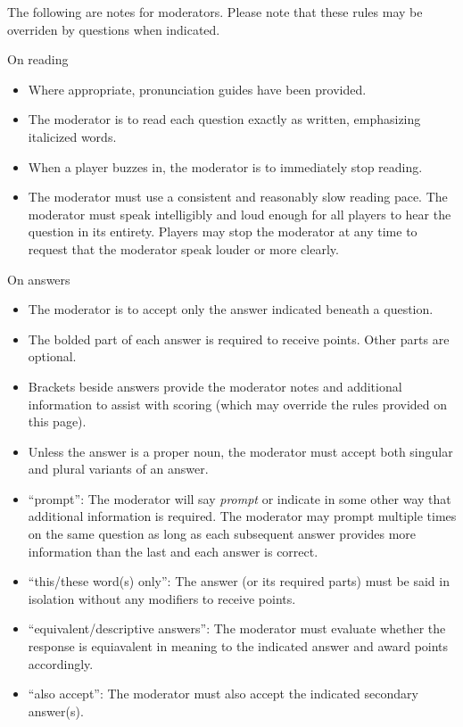 \thispagestyle{empty}
The following are notes for moderators. Please note that these rules may be overriden by questions when indicated.

\vspace*{0.3 cm}
On reading
\begin{itemize}
    \item Where appropriate, pronunciation guides have been provided.
    \item The moderator is to read each question exactly as written, emphasizing italicized words.
    \item When a player buzzes in, the moderator is to immediately stop reading.
    \item The moderator must use a consistent and reasonably slow reading pace. The moderator must speak intelligibly and loud enough for all players to hear the question in its entirety. Players may stop the moderator at any time to request that the moderator speak louder or more clearly.
\end{itemize}

\vspace*{0.3 cm}
On answers
\begin{itemize}
    \item The moderator is to accept only the answer indicated beneath a question.
    \item The bolded part of each answer is required to receive points. Other parts are optional.
    \item Brackets beside answers provide the moderator notes and additional information to assist with scoring (which may override the rules provided on this page).
    \item Unless the answer is a proper noun, the moderator must accept both singular and plural variants of an answer. 
    \item ``prompt'': The moderator will say \textit{prompt} or indicate in some other way that additional information is required. The moderator may prompt multiple times on the same question as long as each subsequent answer provides more information than the last and each answer is correct.
    \item ``this/these word(s) only'': The answer (or its required parts) must be said in isolation without any modifiers to receive points.
    \item ``equivalent/descriptive answers'': The moderator must evaluate whether the response is equiavalent in meaning to the indicated answer and award points accordingly.
    \item ``also accept'': The moderator must also accept the indicated secondary answer(s).
\end{itemize}

